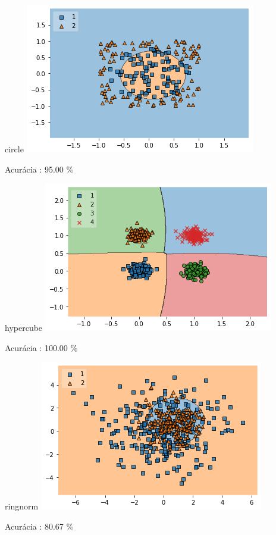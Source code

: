 \documentclass[darkblue]{beamer}
\begin{document}
    \begin{frame}{circle}
        \includegraphics[width=\textwidth]{output_43_0.png}
        \centerline{Acurácia  : 95.00 \%}
    \end{frame}
    
    \begin{frame}{hypercube}
        \includegraphics[width=\textwidth]{output_47_0.png}
        \centerline{Acurácia  : 100.00 \%}
    \end{frame}
    
    \begin{frame}{ringnorm}
        \includegraphics[width=\textwidth]{output_51_0.png}
        \centerline{Acurácia  : 80.67 \%}
    \end{frame}
    
\end{document}
